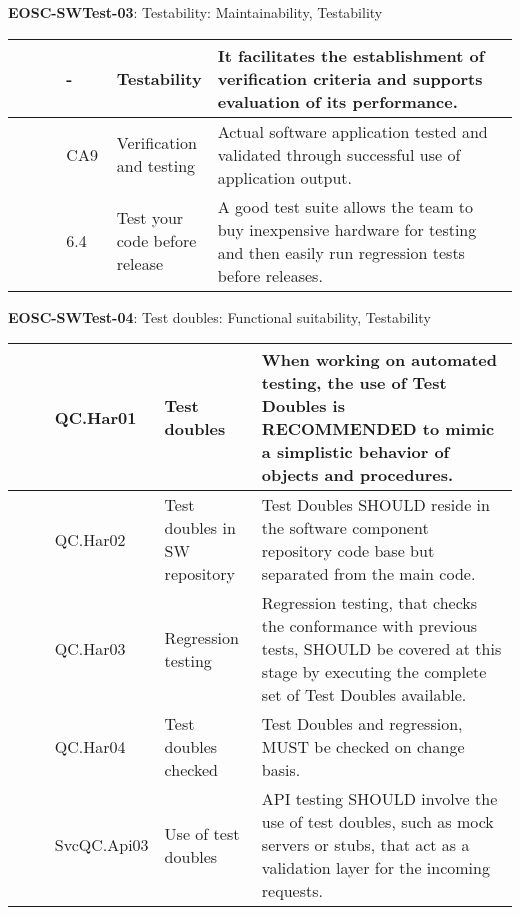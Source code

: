 \textbf{EOSC-SWTest-03}: Testability: Maintainability, Testability
\nopagebreak[4]
\begin{center}
    \tabletail{\hline}
    \tiny
    \begin{supertabular}{|p{0.10\linewidth}|p{0.10\linewidth}|p{0.20\linewidth}|p{0.60\linewidth}|} \hline
        \cite{boehm_quantitative_1976} & - & Testability & It facilitates the establishment of verification criteria and supports evaluation of its performance.\\ \hline
        \cite{shepherdson_cessda_2019} & CA9 & Verification and testing & Actual software application tested and validated through successful use of application output.\\ \hline
        \cite{raymond_software_2013} & 6.4 & Test your code before release & A good test suite allows the team to buy inexpensive hardware for testing and then easily run regression tests before releases.\\ \hline
    \end{supertabular}
\end{center}

\textbf{EOSC-SWTest-04}: Test doubles: Functional suitability, Testability
\nopagebreak[4]
\begin{center}
    \tabletail{\hline}
    \tiny
    \begin{supertabular}{|p{0.10\linewidth}|p{0.10\linewidth}|p{0.20\linewidth}|p{0.60\linewidth}|} \hline
        \cite{orviz_set_2017} & QC.Har01 & Test doubles & When working on automated testing, the use of Test Doubles is RECOMMENDED to mimic a simplistic behavior of objects and procedures.\\ \hline
        \cite{orviz_set_2017} & QC.Har02 & Test doubles in SW repository & Test Doubles SHOULD reside in the software component repository code base but separated from the main code.\\ \hline
        \cite{orviz_set_2017} & QC.Har03 & Regression testing & Regression testing, that checks the conformance with previous tests, SHOULD be covered at this stage by executing the complete set of Test Doubles available.\\ \hline
        \cite{orviz_set_2017} & QC.Har04 & Test doubles checked & Test Doubles and regression, MUST be checked on change basis.\\ \hline
        \cite{orviz_fernandez_eosc-synergy_2020} & SvcQC.Api03 & Use of test doubles & API testing SHOULD involve the use of test doubles, such as mock servers or stubs, that act as a validation layer for the incoming requests.\\ \hline
    \end{supertabular}
\end{center}

